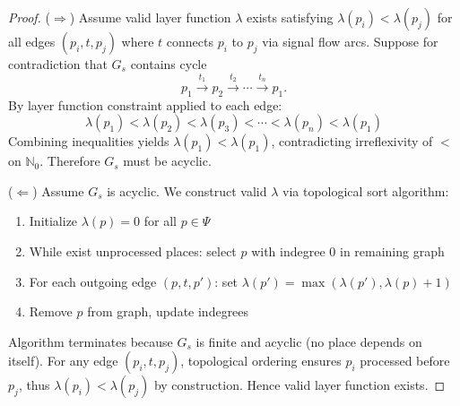 \documentclass[10pt,letterpaper]{article}
\begin{document}
\begin{proof}
($\Rightarrow$) Assume valid layer function $\lambda$ exists satisfying $\lambda(p_i) < \lambda(p_j)$ for all edges $(p_i,t,p_j)$ where $t$ connects $p_i$ to $p_j$ via signal flow arcs. Suppose for contradiction that $G_s$ contains cycle
\[
p_1 \xrightarrow{t_1} p_2 \xrightarrow{t_2} \cdots \xrightarrow{t_n} p_1.
\]
By layer function constraint applied to each edge:
\begin{equation*}
\lambda(p_1) < \lambda(p_2) < \lambda(p_3) < \cdots < \lambda(p_n) < \lambda(p_1)
\end{equation*}
Combining inequalities yields $\lambda(p_1) < \lambda(p_1)$, contradicting irreflexivity of $<$ on $\mathbb{N}_0$. Therefore $G_s$ must be acyclic.

($\Leftarrow$) Assume $G_s$ is acyclic. We construct valid $\lambda$ via topological sort algorithm:
\begin{enumerate}
\item Initialize $\lambda(p) = 0$ for all $p \in \Psi$
\item While exist unprocessed places: select $p$ with indegree 0 in remaining graph
\item For each outgoing edge $(p,t,p')$: set $\lambda(p') = \max(\lambda(p'), \lambda(p) + 1)$
\item Remove $p$ from graph, update indegrees
\end{enumerate}
Algorithm terminates because $G_s$ is finite and acyclic (no place depends on itself). For any edge $(p_i,t,p_j)$, topological ordering ensures $p_i$ processed before $p_j$, thus
$\lambda(p_i) < \lambda(p_j)$
by construction. Hence valid layer function exists.
\end{proof}
\end{document}

